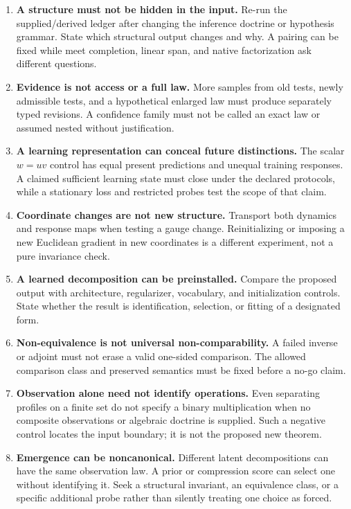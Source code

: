 \documentclass[11pt]{article}
\theoremstyle{remark}
\begin{document}
\begin{enumerate}
\item \textbf{A structure must not be hidden in the input.} Re-run the supplied/derived ledger after changing the inference doctrine or hypothesis grammar. State which structural output changes and why. A pairing can be fixed while meet completion, linear span, and native factorization ask different questions.
\item \textbf{Evidence is not access or a full law.} More samples from old tests, newly admissible tests, and a hypothetical enlarged law must produce separately typed revisions. A confidence family must not be called an exact law or assumed nested without justification.
\item \textbf{A learning representation can conceal future distinctions.} The scalar $w=uv$ control has equal present predictions and unequal training responses. A claimed sufficient learning state must close under the declared protocols, while a stationary loss and restricted probes test the scope of that claim.
\item \textbf{Coordinate changes are not new structure.} Transport both dynamics and response maps when testing a gauge change. Reinitializing or imposing a new Euclidean gradient in new coordinates is a different experiment, not a pure invariance check.
\item \textbf{A learned decomposition can be preinstalled.} Compare the proposed output with architecture, regularizer, vocabulary, and initialization controls. State whether the result is identification, selection, or fitting of a designated form.
\item \textbf{Non-equivalence is not universal non-comparability.} A failed inverse or adjoint must not erase a valid one-sided comparison. The allowed comparison class and preserved semantics must be fixed before a no-go claim.
\item \textbf{Observation alone need not identify operations.} Even separating profiles on a finite set do not specify a binary multiplication when no composite observations or algebraic doctrine is supplied. Such a negative control locates the input boundary; it is not the proposed new theorem.
\item \textbf{Emergence can be noncanonical.} Different latent decompositions can have the same observation law. A prior or compression score can select one without identifying it. Seek a structural invariant, an equivalence class, or a specific additional probe rather than silently treating one choice as forced.

\end{enumerate}
\end{document}
